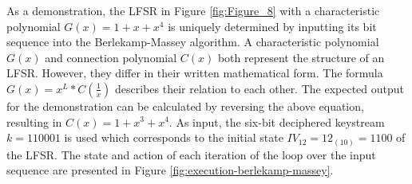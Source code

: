 \clearpage

As a demonstration, the LFSR in Figure \ref{fig:Figure_8} with a characteristic polynomial $G(x) = 1+x+x^4$ is uniquely determined by inputting its bit sequence into the Berlekamp-Massey algorithm. A characteristic polynomial $G(x)$ and connection polynomial $C(x)$ both represent the structure of an LFSR. However, they differ in their written mathematical form. The formula $G(x) = x^L * C(\frac{1}{x})$ describes their relation to each other. The expected output for the demonstration can be calculated by reversing the above equation, resulting in $C(x) = 1+x^3+x^4$. As input, the six-bit deciphered keystream $k=110001$ is used which corresponds to the initial state $IV_{12}=12_{(10)}=1100$ of the LFSR. The state and action of each iteration of the loop over the input sequence are presented in Figure \ref{fig:execution-berlekamp-massey}. \\ 

